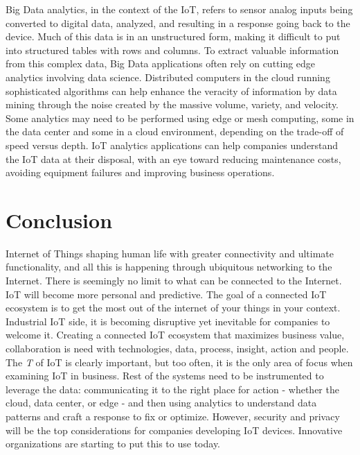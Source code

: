 \documentclass[sigconf]{acmart}
\begin{document}
Big Data analytics, in the context of the IoT, refers to sensor analog inputs being converted to digital data, analyzed, and resulting in a response going back to the device. Much of this data is in an unstructured form, making it difficult to put into structured tables with rows and columns. To extract valuable information from this complex data, Big Data applications often rely on cutting edge analytics involving data science. Distributed computers in the cloud running sophisticated algorithms can help enhance the veracity of information by data mining through the noise created by the massive volume, variety, and velocity. Some analytics may need to be performed using edge or mesh computing, some in the data center and some in a cloud environment, depending on the trade-off of speed versus depth. IoT analytics applications can help companies understand the IoT data at their disposal, with an eye toward reducing maintenance costs, avoiding equipment failures and improving business operations. 


\section{Conclusion}

Internet of Things shaping human life with greater connectivity and ultimate functionality, and all this is happening through ubiquitous networking to the Internet. There is seemingly no limit to what can be connected to the Internet. IoT will become more personal and predictive. The goal of a connected IoT ecosystem is to get the most out of the internet of your things in your context. Industrial IoT side, it is becoming disruptive yet inevitable for companies to welcome it. Creating a connected IoT ecosystem that maximizes business value, collaboration is need with technologies, data, process, insight, action and people. The {\em T} of IoT is clearly important, but too often, it is the only area of focus when examining IoT in business. Rest of the systems need to be instrumented to leverage the data: communicating it to the right place for action - whether the cloud, data center, or edge - and then using analytics to understand data patterns and craft a response to fix or optimize. However, security and privacy will be the top considerations for companies developing IoT devices. Innovative organizations are starting to put this to use today.



 
\end{document}
